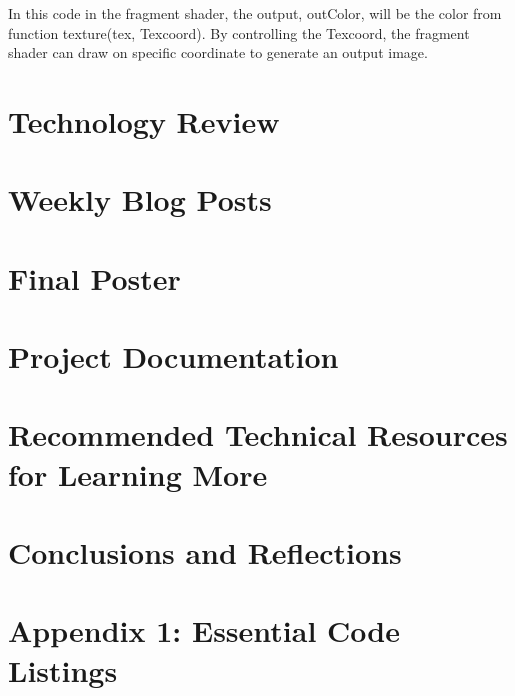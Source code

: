 \documentclass[letterpaper,10pt,serif,draftclsnofoot,onecolumn,compsoc,titlepage]{IEEEtran}
\begin{document}
In this code in the fragment shader, the output, outColor, will be the color from 
function texture(tex, Texcoord). By controlling the Texcoord, the fragment shader 
can draw on specific coordinate to generate an output image.\\

\newpage

\section{Technology Review}


\newpage

\section{Weekly Blog Posts}


\newpage

\section{Final Poster}


\newpage

\section{Project Documentation}


\newpage

\section{Recommended Technical Resources for Learning More}


\newpage

\section{Conclusions and Reflections}


\newpage

\section{Appendix 1: Essential Code Listings}


\nocite{*}
\end{document}
